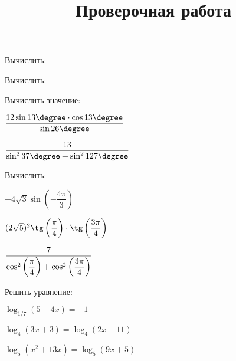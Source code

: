 %
\newpage
\title{Проверочная работа}
\begin{listofex}
	\item Вычислить:
	\begin{enumcols}[itemcolumns=3]
		\item {}
		\item {}
		\item {}
		\item {}
		\item {}
		\item {}
	\end{enumcols}
	\item Вычислить:
	\begin{enumcols}[itemcolumns=2]
		\item {}
		\item {}
		\item {}
		\item {}
	\end{enumcols}
	\item Вычислить значение:
	\begin{enumcols}[itemcolumns=2]
		\item \( \dfrac{12\sin13\degree\cdot\cos13\degree}{\sin26\degree} \)
		\item \( \dfrac{13}{\sin^237\degree+\sin^2127\degree} \)
	\end{enumcols}
	\item Вычислить:
	\begin{enumcols}[itemcolumns=3]
		\item \( -4\sqrt{3}\sin\left( -\dfrac{4\pi}{3} \right) \)
		\item \( (2\sqrt{5})^2\tg\left( \dfrac{\vphantom{3}\pi}{4} \right)\cdot\tg\left( \dfrac{3\pi}{4} \right) \)
		\item \( \dfrac{7}{\cos^2\left( \dfrac{\vphantom{5}\pi}{4} \right)+\cos^2\left( \dfrac{3\pi}{4} \right)} \)
	\end{enumcols}
	\item Решить уравнение:
	\begin{enumcols}[itemcolumns=2]
		\item \( \log_{1/7}(5-4x)=-1 \)
		\item \( \log_4(3x+3)=\log_4(2x-11) \)
		\item \( \log_5(x^2+13x)=\log_5(9x+5) \)
		\item {}
		\item {}
	\end{enumcols}
	\item {}
\end{listofex}